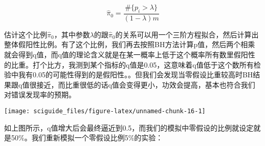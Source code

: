 \documentclass[]{tufte-book}
\newenvironment{Shaded}{}{}
\newcommand{\AttributeTok}[1]{\textcolor[rgb]{0.49,0.56,0.16}{#1}}
\newcommand{\CommentTok}[1]{\textcolor[rgb]{0.38,0.63,0.69}{\textit{#1}}}
\newcommand{\FunctionTok}[1]{\textcolor[rgb]{0.02,0.16,0.49}{#1}}
\newcommand{\NormalTok}[1]{#1}
\newcommand{\OtherTok}[1]{\textcolor[rgb]{0.00,0.44,0.13}{#1}}
\newcommand{\SpecialCharTok}[1]{\textcolor[rgb]{0.25,0.44,0.63}{#1}}
\newcommand{\StringTok}[1]{\textcolor[rgb]{0.25,0.44,0.63}{#1}}
\begin{document}
\[
\hat\pi_0 = \frac{\#\{p_i>\lambda\}}{(1-\lambda)m}
\]

估计这个比例\(\hat\pi_0\)，其中参数\(\lambda\)的跟\(\hat\pi_0\)的关系可以用一个三阶方程拟合，然后计算出整体假阳性比例。有了这个比例，我们再去按照BH方法计算p值，然后两个相乘就会得到q值，而q值的理论含义就是在某一概率上低于这个概率所有数里假阳性的比重。打个比方，我测到某个指标的q值是0.05，这意味着q值低于这个数所有检验中我有0.05的可能性得到的是假阳性。。但我们会发现当零假设比重较高时BH结果跟q值很接近，而比重很低的话q值会变得更小，功效会提高，基本也符合我们对错误发现率的预期。

\begin{Shaded}
\end{Shaded}

\texttt{[image: sciguide\_files/figure-latex/unnamed-chunk-16-1]}

如上图所示，q值增大后会最终逼近到0.5，而我们的模拟中零假设的比例就设定就是50\%。我们重新模拟一个零假设比例5\%的实验：
\end{document}
